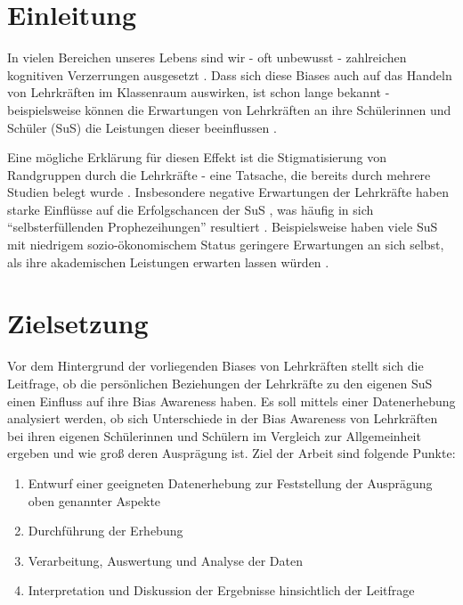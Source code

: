 \documentclass[11pt, a4paper]{article}
\begin{document}


\thispagestyle{empty}
\tableofcontents
\newpage
\setcounter{page}{1}


\section{Einleitung}

In vielen Bereichen unseres Lebens sind wir - oft unbewusst - zahlreichen kognitiven Verzerrungen ausgesetzt \cite{pohl2004cognitive}.
Dass sich diese Biases auch auf das Handeln von Lehrkräften im Klassenraum auswirken, ist schon lange bekannt - beispielsweise können die Erwartungen von Lehrkräften an ihre Schülerinnen und Schüler (SuS) die Leistungen dieser beeinflussen \cite{rosenthal1968pygmalion}.

Eine mögliche Erklärung für diesen Effekt ist die Stigmatisierung von Randgruppen durch die Lehrkräfte - eine Tatsache, die bereits durch mehrere Studien belegt wurde \cite{glock2015preservice, glock2017bad, glock2019studies}.
Insbesondere negative Erwartungen der Lehrkräfte haben starke Einflüsse auf die Erfolgschancen der SuS \cite{jussim1996social}, was häufig in sich ``selbsterfüllenden Prophezeihungen'' resultiert \cite{jussim2005teacher}.
Beispielsweise haben viele SuS mit niedrigem sozio-ökonomischem Status geringere Erwartungen an sich selbst, als ihre akademischen Leistungen erwarten lassen würden \cite[S.~15]{oecd2019}.


\section{Zielsetzung}

Vor dem Hintergrund der vorliegenden Biases von Lehrkräften stellt sich die Leitfrage, ob die persönlichen Beziehungen der Lehrkräfte zu den eigenen SuS einen Einfluss auf ihre Bias Awareness haben.
Es soll mittels einer Datenerhebung analysiert werden, ob sich Unterschiede in der Bias Awareness von Lehrkräften bei ihren eigenen Schülerinnen und Schülern im Vergleich zur Allgemeinheit ergeben und wie groß deren Ausprägung ist.
Ziel der Arbeit sind folgende Punkte:
\begin{enumerate}
	\item Entwurf einer geeigneten Datenerhebung zur Feststellung der Ausprägung oben genannter Aspekte
	\item Durchführung der Erhebung
	\item Verarbeitung, Auswertung und Analyse der Daten
	\item Interpretation und Diskussion der Ergebnisse hinsichtlich der Leitfrage
\end{enumerate}
\end{document}
